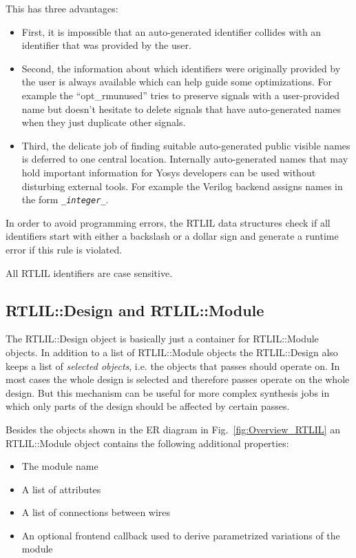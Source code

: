 This has three advantages:

\begin{itemize}
\item First, it is impossible that an auto-generated identifier collides with
an identifier that was provided by the user.
\item Second, the information about which identifiers were originally
provided by the user is always available which can help guide some optimizations. For example the ``opt\_rmunused''
tries to preserve signals with a user-provided name but doesn't hesitate to delete signals that have
auto-generated names when they just duplicate other signals.
\item Third, the delicate job of finding suitable auto-generated public visible
names is deferred to one central location. Internally auto-generated names that
may hold important information for Yosys developers can be used without
disturbing external tools. For example the Verilog backend assigns names in the form {\tt \_{\it integer}\_}.
\end{itemize}

In order to avoid programming errors, the RTLIL data structures check if all
identifiers start with either a backslash or a dollar sign and generate a
runtime error if this rule is violated.

All RTLIL identifiers are case sensitive.

\subsection{RTLIL::Design and RTLIL::Module}

The RTLIL::Design object is basically just a container for RTLIL::Module objects. In addition to
a list of RTLIL::Module objects the RTLIL::Design also keeps a list of {\it selected objects}, i.e.
the objects that passes should operate on. In most cases the whole design is selected and therefore
passes operate on the whole design. But this mechanism can be useful for more complex synthesis jobs
in which only parts of the design should be affected by certain passes.

Besides the objects shown in the ER diagram in Fig.~\ref{fig:Overview_RTLIL} an RTLIL::Module object
contains the following additional properties:

\begin{itemize}
\item The module name
\item A list of attributes
\item A list of connections between wires
\item An optional frontend callback used to derive parametrized variations of the module
\end{itemize}

